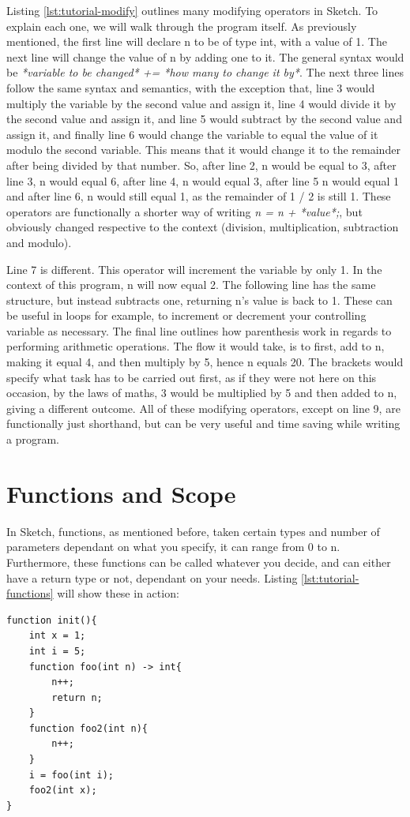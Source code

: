 \documentclass{l3proj}
\begin{document}
Listing \ref{lst:tutorial-modify} outlines many modifying operators in Sketch. To explain each one, we will walk through the program itself. As previously mentioned, the first line will declare n to be of type int, with a value of 1. The next line will change the value of n by adding one to it. The general syntax would be \textit{*variable to be changed* += *how many to change it by*}. The next three lines follow the same syntax and semantics, with the exception that, line 3 would multiply the variable by the second value and assign it, line 4 would divide it by the second value and assign it, and line 5 would subtract by the second value and assign it, and finally line 6 would change the variable to equal the value of it modulo the second variable. This means that it would change it to the remainder after being divided by that number. So, after line 2, n would be equal to 3, after line 3, n would equal 6, after line 4, n would equal 3, after line 5 n would equal 1 and after line 6, n would still equal 1, as the remainder of 1 / 2 is still 1. These operators are functionally a shorter way of writing \textit{n = n + *value*;}, but obviously changed respective to the context (division, multiplication, subtraction and modulo).

Line 7 is different. This operator will increment the variable by only 1. In the context of this program, n will now equal 2. The following line has the same structure, but instead subtracts one, returning n's value is back to 1. These can be useful in loops for example, to increment or decrement your controlling variable as necessary. The final line outlines how parenthesis work in regards to performing arithmetic operations. The flow it would take, is to first, add to n, making it equal 4, and then multiply by 5, hence n equals 20. The brackets would specify what task has to be carried out first, as if they were not here on this occasion, by the laws of maths, 3 would be multiplied by 5 and then added to n, giving a different outcome. All of these modifying operators, except on line 9, are functionally just shorthand, but can be very useful and time saving while writing a program.

\section{Functions and Scope}
\label{func}
In Sketch, functions, as mentioned before, taken certain types and number of parameters dependant on what you specify, it can range from 0 to n. Furthermore, these functions can be called whatever you decide, and can either have a return type or not, dependant on your needs. Listing \ref{lst:tutorial-functions} will show these in action:
\begin{lstlisting}[caption={Functions and Scope}, label={lst:tutorial-functions}]
function init(){
    int x = 1;
    int i = 5;
    function foo(int n) -> int{
        n++;
        return n;
    }
    function foo2(int n){
        n++;
    }
    i = foo(int i);
    foo2(int x);
}
\end{lstlisting}
\end{document}
